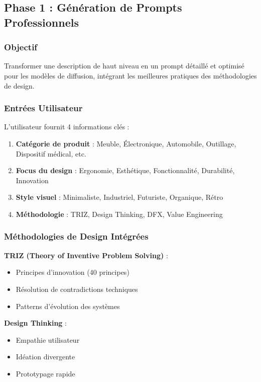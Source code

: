 \subsection{Phase 1 : Génération de Prompts Professionnels}

\subsubsection{Objectif}

Transformer une description de haut niveau en un prompt détaillé et optimisé pour les modèles de diffusion, intégrant les meilleures pratiques des méthodologies de design.

\subsubsection{Entrées Utilisateur}

L'utilisateur fournit 4 informations clés :

\begin{enumerate}[leftmargin=*]
    \item \textbf{Catégorie de produit} : Meuble, Électronique, Automobile, Outillage, Dispositif médical, etc.
    \item \textbf{Focus du design} : Ergonomie, Esthétique, Fonctionnalité, Durabilité, Innovation
    \item \textbf{Style visuel} : Minimaliste, Industriel, Futuriste, Organique, Rétro
    \item \textbf{Méthodologie} : TRIZ, Design Thinking, DFX, Value Engineering
\end{enumerate}

\subsubsection{Méthodologies de Design Intégrées}

\textbf{TRIZ (Theory of Inventive Problem Solving)} :
\begin{itemize}[leftmargin=*]
    \item Principes d'innovation (40 principes)
    \item Résolution de contradictions techniques
    \item Patterns d'évolution des systèmes
\end{itemize}

\textbf{Design Thinking} :
\begin{itemize}[leftmargin=*]
    \item Empathie utilisateur
    \item Idéation divergente
    \item Prototypage rapide
\end{itemize}

